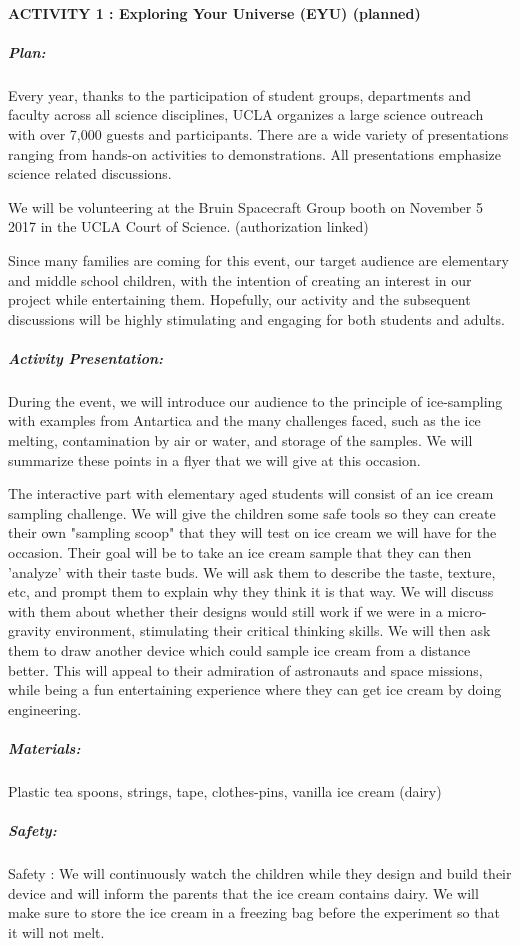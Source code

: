 \documentclass{article}
\begin{document}
\paragraph{ACTIVITY 1 : Exploring Your Universe (EYU) (planned)}
\subparagraph{Plan:}
Every year, thanks to the participation of student groups, departments and faculty across all science disciplines, UCLA organizes a large science outreach with over 7,000 guests and participants. There are a wide variety of presentations ranging from hands-on activities to demonstrations. All presentations emphasize science related discussions. \par
We will be volunteering at the Bruin Spacecraft Group booth on November 5 2017 in the UCLA Court of Science. (authorization linked) \par
Since many families are coming for this event, our target audience are elementary and middle school children, with the intention of creating an interest in our project while entertaining them. Hopefully, our activity and the subsequent discussions will be highly stimulating and engaging for both students and adults. \par
\subparagraph{Activity Presentation:}
During the event, we will introduce our audience to the principle of ice-sampling with examples from Antartica and the many challenges faced, such as the ice melting, contamination by air or water, and storage of the samples. We will summarize these points in a flyer that we will give at this occasion.\par
The interactive part with elementary aged students will consist of an ice cream sampling challenge. We will give the children some safe tools so they can create their own "sampling scoop" that they will test on ice cream we will have for the occasion. Their goal will be to take an ice cream sample that they can then 'analyze' with their taste buds. We will ask them to describe the taste, texture, etc, and prompt them to explain why they think it is that way. We will discuss with them about whether their designs would still work if we were in a micro-gravity environment, stimulating their critical thinking skills. We will then ask them to draw another device which could sample ice cream from a distance better. This will appeal to their admiration of astronauts and space missions, while being a fun entertaining experience where they can get ice cream by doing engineering. \par
\subparagraph{Materials:}
Plastic tea spoons, strings, tape, clothes-pins, vanilla ice cream (dairy)
\subparagraph{Safety:}
Safety : We will continuously watch the children while they design and build their device and will inform the parents that the ice cream contains dairy. We will make sure to store the ice cream in a freezing bag before the experiment so that it will not melt. \par
\newpage
\end{document}
